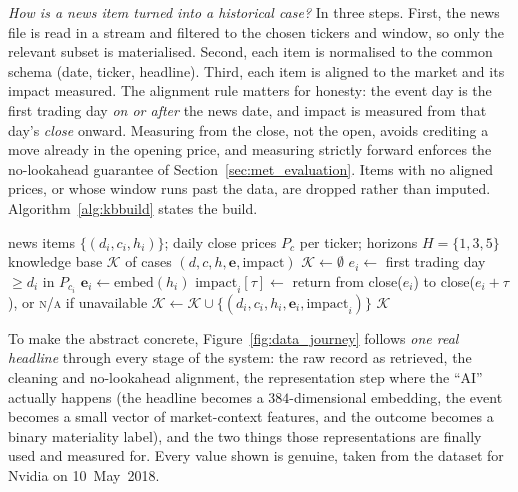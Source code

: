 \emph{How is a news item turned into a historical case?} In three steps. First, the news file is read in a
stream and filtered to the chosen tickers and window, so only the relevant subset is materialised. Second,
each item is normalised to the common schema (date, ticker, headline). Third, each item is aligned to the
market and its impact measured. The alignment rule matters for honesty: the event day is the first trading
day \emph{on or after} the news date, and impact is measured from that day's \emph{close} onward. Measuring
from the close, not the open, avoids crediting a move already in the opening price, and measuring strictly
forward enforces the no-lookahead guarantee of Section~\ref{sec:met_evaluation}. Items with no aligned
prices, or whose window runs past the data, are dropped rather than imputed. Algorithm~\ref{alg:kbbuild}
states the build.

\begin{algorithm}[ht]
\caption{Knowledge-base construction with event alignment.}
\label{alg:kbbuild}
\begin{algorithmic}[1]
\Require news items $\{(d_i,c_i,h_i)\}$; daily close prices $P_c$ per ticker; horizons $H=\{1,3,5\}$
\Ensure knowledge base $\mathcal{K}$ of cases $(d,c,h,\mathbf{e},\text{impact})$
\State $\mathcal{K} \gets \emptyset$
  \State $e_i \gets$ first trading day $\ge d_i$ in $P_{c_i}$ 
    \State $\mathbf{e}_i \gets \mathrm{embed}(h_i)$ 
      \State $\text{impact}_i[\tau] \gets$ return from close($e_i$) to close($e_i{+}\tau$), or \textsc{n/a} if unavailable
    \EndFor
    \State $\mathcal{K} \gets \mathcal{K} \cup \{(d_i,c_i,h_i,\mathbf{e}_i,\text{impact}_i)\}$
  \EndIf
\EndFor
\State \Return $\mathcal{K}$
\end{algorithmic}
\end{algorithm}

To make the abstract concrete, Figure~\ref{fig:data_journey} follows \emph{one real headline} through
every stage of the system: the raw record as retrieved, the cleaning and no-lookahead alignment, the
representation step where the ``AI'' actually happens (the headline becomes a $384$-dimensional
embedding, the event becomes a small vector of market-context features, and the outcome becomes a
binary materiality label), and the two things those representations are finally used and measured for.
Every value shown is genuine, taken from the dataset for Nvidia on 10~May~2018.

